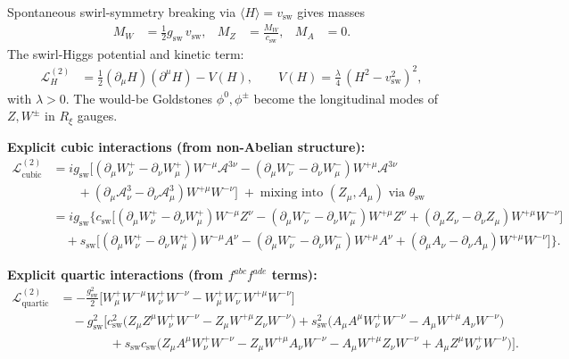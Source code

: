 \documentclass[11pt]{article}
\begin{document}
    Spontaneous swirl-symmetry breaking via \(\langle H\rangle = v_\text{sw}\) gives masses
    \begin{align}
        M_W &= \frac{1}{2} g_\text{sw}\, v_\text{sw},
        &
        M_Z &= \frac{M_W}{c_\text{sw}},
        &
        M_A &= 0.
    \end{align}
    The swirl-Higgs potential and kinetic term:
    \begin{align}
        \mathcal{L}^{(2)}_{H}&=\frac{1}{2}(\partial_\mu H)(\partial^\mu H) - V(H),\qquad
        V(H)=\frac{\lambda}{4}\,(H^2 - v_\text{sw}^2)^2,
    \end{align}
    with \(\lambda>0\).  The would-be Goldstones \(\phi^0,\phi^\pm\) become the longitudinal modes of \(Z,W^\pm\) in $R_\xi$ gauges.

    \noindent\textbf{Explicit cubic interactions (from non-Abelian structure):}
    \begin{align}
        \mathcal{L}^{(2)}_{\text{cubic}}
        &= i g_\text{sw}\Big[
            (\partial_\mu W_\nu^+ - \partial_\nu W_\mu^+) W^{-\mu} \mathcal{A}^{3\nu}
            -(\partial_\mu W_\nu^- - \partial_\nu W_\mu^-) W^{+\mu} \mathcal{A}^{3\nu}
            \nonumber\\
            &\qquad
            +(\partial_\mu \mathcal{A}_\nu^3 - \partial_\nu \mathcal{A}_\mu^3) W^{+\mu} W^{-\nu}
            \Big] \;+\; \text{mixing into } (Z_\mu, A_\mu)\text{ via } \theta_\text{sw} \\
        &= i g_\text{sw}\Big\{
        c_\text{sw}\big[
            (\partial_\mu W_\nu^+ - \partial_\nu W_\mu^+) W^{-\mu} Z^{\nu}
            -(\partial_\mu W_\nu^- - \partial_\nu W_\mu^-) W^{+\mu} Z^{\nu}
            +( \partial_\mu Z_\nu - \partial_\nu Z_\mu) W^{+\mu} W^{-\nu}
            \big]\nonumber\\
        &\quad + s_\text{sw}\big[
            (\partial_\mu W_\nu^+ - \partial_\nu W_\mu^+) W^{-\mu} A^{\nu}
            -(\partial_\mu W_\nu^- - \partial_\nu W_\mu^-) W^{+\mu} A^{\nu}
            +( \partial_\mu A_\nu - \partial_\nu A_\mu) W^{+\mu} W^{-\nu}
            \big]
        \Big\}. \label{eq:cubic}
    \end{align}

    \noindent\textbf{Explicit quartic interactions (from \(f^{abc}f^{ade}\) terms):}
    \begin{align}
        \mathcal{L}^{(2)}_{\text{quartic}}
        &= -\frac{g_\text{sw}^2}{2}\Big[
            W_\mu^+ W^{-\mu} W_\nu^+ W^{-\nu}
            - W_\mu^+ W_\nu^- W^{+\mu} W^{-\nu}
            \Big]\nonumber\\
        &\quad - g_\text{sw}^2 \Big[
            c_\text{sw}^2 \big( Z_\mu Z^\mu W_\nu^+ W^{-\nu} - Z_\mu W^{+\mu} Z_\nu W^{-\nu} \big)
            + s_\text{sw}^2 \big( A_\mu A^\mu W_\nu^+ W^{-\nu} - A_\mu W^{+\mu} A_\nu W^{-\nu} \big)\nonumber\\
            &\qquad\qquad
            + s_\text{sw} c_\text{sw} \big( Z_\mu A^\mu W_\nu^+ W^{-\nu} - Z_\mu W^{+\mu} A_\nu W^{-\nu} - A_\mu W^{+\mu} Z_\nu W^{-\nu} + A_\mu Z^\mu W_\nu^+ W^{-\nu}\big)
            \Big]. \label{eq:quartic}
    \end{align}
\end{document}

